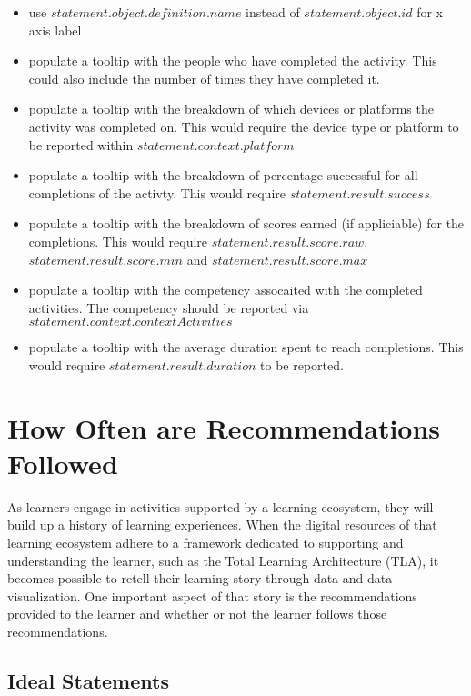 \documentclass{article}
\begin{document}
\begin{itemize}
\item use $statement.object.definition.name$ instead of
  $statement.object.id$ for x axis label
\item populate a tooltip with the people who have completed the
  activity. This could also include the number of times they have
  completed it.
\item populate a tooltip with the breakdown of which devices or platforms the
  activity was completed on. This would require the device type or platform to be
  reported within $statement.context.platform$
\item populate a tooltip with the breakdown of percentage successful
  for all completions of the activty. This would require
  $statement.result.success$
\item populate a tooltip with the breakdown of scores earned (if
  appliciable) for the completions. This would require
  $statement.result.score.raw$, $statement.result.score.min$ and
  $statement.result.score.max$
\item populate a tooltip with the competency assocaited with the
  completed activities. The competency should be reported
  via $statement.context.contextActivities$
\item populate a tooltip with the average duration spent to reach
  completions. This would require $statement.result.duration$ to be reported.
\end{itemize}

\section{How Often are Recommendations Followed}

As learners engage in activities supported by a learning ecosystem, they will build
up a history of learning experiences. When the digital resources of that learning ecosystem
adhere to a framework dedicated to supporting and understanding the
learner, such as the Total Learning Architecture (TLA), it becomes
possible to retell their learning story through data and data
visualization. One important aspect of that story is the
recommendations provided to the learner and whether or not the learner
follows those recommendations.

\subsection{Ideal Statements}
\end{document}
